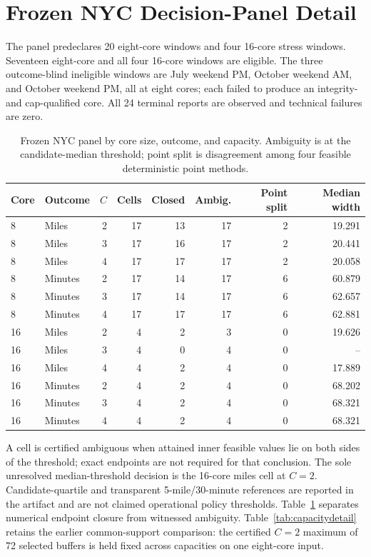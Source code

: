 \section{Frozen NYC Decision-Panel Detail}
The panel predeclares 20 eight-core windows and four 16-core stress windows.
Seventeen eight-core and all four 16-core windows are eligible. The three
outcome-blind ineligible windows are July weekend PM, October weekend AM,
and October weekend PM, all at eight cores; each failed
to produce an integrity- and cap-qualified core. All 24 terminal reports are
observed and technical failures are zero.

\begin{table}[t]
\caption{Frozen NYC panel by core size, outcome, and capacity. Ambiguity is at
the candidate-median threshold; point split is disagreement among four
feasible deterministic point methods.}
\label{tab:paneldetail}
\small
\centering
\begin{tabular}{@{}llrrrrrr@{}}
\toprule
Core & Outcome & $C$ & Cells & Closed & Ambig. & Point split & Median width \\
\midrule
8 & Miles   & 2 & 17 & 13 & 17 & 2 & 19.291 \\
8 & Miles   & 3 & 17 & 16 & 17 & 2 & 20.441 \\
8 & Miles   & 4 & 17 & 17 & 17 & 2 & 20.058 \\
8 & Minutes & 2 & 17 & 14 & 17 & 6 & 60.879 \\
8 & Minutes & 3 & 17 & 14 & 17 & 6 & 62.657 \\
8 & Minutes & 4 & 17 & 17 & 17 & 6 & 62.881 \\
16 & Miles   & 2 & 4 & 2 & 3 & 0 & 19.626 \\
16 & Miles   & 3 & 4 & 0 & 4 & 0 & -- \\
16 & Miles   & 4 & 4 & 2 & 4 & 0 & 17.889 \\
16 & Minutes & 2 & 4 & 2 & 4 & 0 & 68.202 \\
16 & Minutes & 3 & 4 & 2 & 4 & 0 & 68.321 \\
16 & Minutes & 4 & 4 & 2 & 4 & 0 & 68.321 \\
\bottomrule
\end{tabular}
\end{table}

A cell is certified ambiguous when attained inner feasible values lie on both
sides of the threshold; exact endpoints are not required for that conclusion.
The sole unresolved median-threshold decision is the 16-core miles cell at
$C=2$. Candidate-quartile and transparent 5-mile/30-minute references are
reported in the artifact and are not claimed operational policy thresholds.
Table~\ref{tab:paneldetail} separates numerical endpoint closure from witnessed
ambiguity. Table~\ref{tab:capacitydetail} retains the earlier common-support
comparison: the certified $C=2$ maximum of 72 selected buffers is held fixed
across capacities on one eight-core input.


